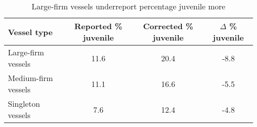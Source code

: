 \begin{table}[tb]
\centering
\caption{Large-firm vessels underreport percentage juvenile more} 
\label{large_underreport}
\begin{tabular}{lccc}
   \toprule Vessel type & Reported \% juvenile & Corrected \% juvenile & $\Delta$ \% juvenile \\ 
   \midrule Large-firm vessels & 11.6 & 20.4 & -8.8 \\ 
  Medium-firm vessels & 11.1 & 16.6 & -5.5 \\ 
  Singleton vessels & 7.6 & 12.4 & -4.8 \\ 
   \bottomrule \end{tabular}
\end{table}
